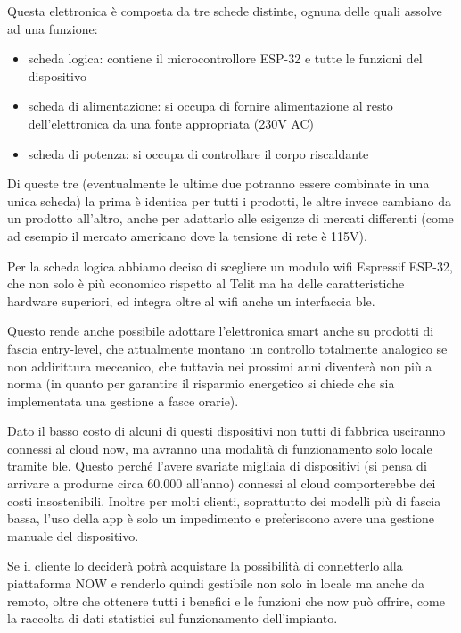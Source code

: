\documentclass[12pt,a4paper,twoside,titlepage]{book}
\begin{document}
Questa elettronica è composta da tre schede distinte, ognuna delle quali assolve
ad una funzione:
\begin{itemize}
    \item scheda logica: contiene il microcontrollore ESP-32 e tutte le funzioni del dispositivo
    \item scheda di alimentazione: si occupa di fornire alimentazione al resto dell'elettronica
        da una fonte appropriata (230V AC)
    \item scheda di potenza: si occupa di controllare il corpo riscaldante
\end{itemize}

Di queste tre (eventualmente le ultime due potranno essere combinate in una
unica scheda) la prima è identica per tutti i prodotti, le altre invece cambiano
da un prodotto all'altro, anche per adattarlo alle esigenze di mercati differenti
(come ad esempio il mercato americano dove la tensione di rete è 115V).

Per la scheda logica abbiamo deciso di scegliere un modulo \Gls{wifi} Espressif
ESP-32, che non solo è più economico rispetto al Telit ma ha delle caratteristiche
hardware superiori, ed integra oltre al \Gls{wifi} anche un interfaccia \Gls{ble}.

Questo rende anche possibile adottare l'elettronica smart anche su prodotti di
fascia entry-level, che attualmente montano un controllo totalmente analogico se non
addirittura meccanico, che tuttavia nei prossimi anni diventerà non più a norma (in
quanto per garantire il risparmio energetico si chiede che sia implementata una gestione
a fasce orarie).

Dato il basso costo di alcuni di questi dispositivi non tutti di fabbrica usciranno
connessi al cloud \Gls{now}, ma avranno una modalità di funzionamento solo locale
tramite \Gls{ble}. Questo perché l'avere svariate migliaia di dispositivi
(si pensa di arrivare a produrne circa 60.000 all'anno) connessi al cloud comporterebbe
dei costi insostenibili. Inoltre per molti clienti, soprattutto dei modelli più di
fascia bassa, l'uso della app è solo un impedimento e preferiscono avere una gestione
manuale del dispositivo.

Se il cliente lo deciderà potrà acquistare la possibilità di connetterlo alla piattaforma
NOW e renderlo quindi gestibile non solo in locale ma anche da remoto, oltre che
ottenere tutti i benefici e le funzioni che \Gls{now} può offrire, come la
raccolta di dati statistici sul funzionamento dell'impianto.
\end{document}

